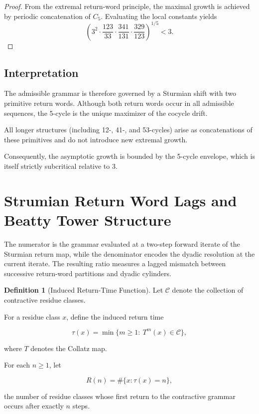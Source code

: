 \documentclass[12pt, oneside]{article}
\numberwithin{equation}{section}
\theoremstyle{definition}
\newtheorem{definition}{Definition}[section]
\theoremstyle{plain}
\theoremstyle{remark}
\begin{document}
\begin{proof}
From the extremal return-word principle, the maximal growth is achieved by
periodic concatenation of $C_5$. Evaluating the local constants yields
\[
\left(
3^{2}
\cdot \frac{123}{33}
\cdot \frac{341}{131}
\cdot \frac{329}{123}
\right)^{1/5}
< 3.
\]
\end{proof}

\subsection{Interpretation}

The admissible grammar is therefore governed by a Sturmian shift with two
primitive return words. Although both return words occur in all admissible
sequences, the 5-cycle is the unique maximizer of the cocycle drift.

All longer structures (including 12-, 41-, and 53-cycles) arise as
concatenations of these primitives and do not introduce new extremal growth.

Consequently, the asymptotic growth is bounded by the 5-cycle envelope,
which is itself strictly subcritical relative to 3.

\section{Strumian Return Word Lags and Beatty Tower Structure}
\label{sec:sturmian-return-lags}

The numerator is the grammar evaluated at a two-step forward iterate of the
Sturmian return map, while the denominator encodes the dyadic resolution at
the current iterate. The resulting ratio measures a lagged mismatch between
successive return-word partitions and dyadic cylinders.

\begin{definition}[Induced Return-Time Function]
Let $\mathcal{C}$ denote the collection of contractive residue classes.

For a residue class $x$, define the induced return time

\[
\tau(x)
=
\min\{m\ge1:\ T^{m}(x)\in\mathcal{C}\},
\]

where $T$ denotes the Collatz map.

For each $n\ge1$, let

\[
R(n)
=
\#\{x:\tau(x)=n\},
\]

the number of residue classes whose first return to the contractive
grammar occurs after exactly $n$ steps.

\end{definition}
\end{document}
